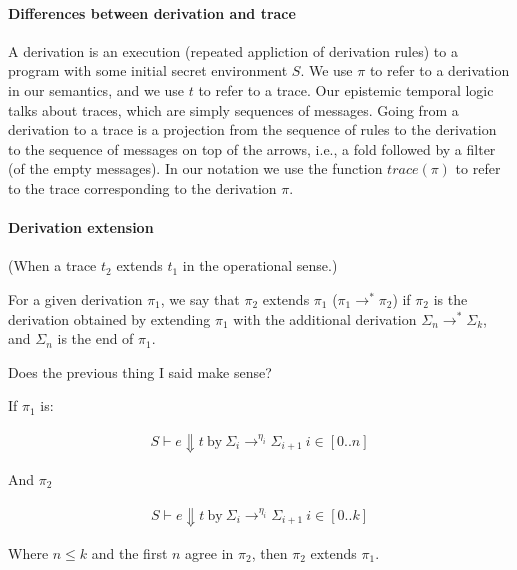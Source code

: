 \documentclass[conference]{IEEEtran}
\theoremstyle{definition}
\newcommand{\judge}{\vdash}
\newcommand{\tr}{t}
\begin{document}
\paragraph*{Differences between derivation and trace}

A derivation is an execution (repeated appliction of derivation rules)
to a program with some initial secret environment $S$.  We use $\pi$
to refer to a derivation in our semantics, and we use $\tr$ to refer
to a trace.  Our epistemic temporal logic talks about traces, which
are simply sequences of messages.  Going from a derivation to a trace
is a projection from the sequence of rules to the derivation to the
sequence of messages on top of the arrows, i.e., a fold followed by a
filter (of the empty messages).  In our notation we use the function
$trace(\pi)$ to refer to the trace corresponding to the derivation
$\pi$.

\paragraph*{Derivation extension} 

(When a trace $\tr_2$ extends $\tr_1$ in the operational sense.)

For a given derivation $\pi_1$, we say that $\pi_2$ extends $\pi_1$
($\pi_1 \rightarrow^\ast \pi_2$) if $\pi_2$ is the derivation obtained
by extending $\pi_1$ with the additional derivation $\Sigma_n
\rightarrow^\ast \Sigma_k$, and $\Sigma_n$ is the end of $\pi_1$.

Does the previous thing I said make sense?

If $\pi_1$ is: 

\begin{displaymath}
  \begin{array}{c}
    S \judge e \Downarrow \tr ~ \text{by} ~ \Sigma_i
    \rightarrow^{\eta_i} \Sigma_{i+1} ~ i \in [0..n]
  \end{array}
\end{displaymath}

And $\pi_2$ 

\begin{displaymath}
  \begin{array}{c}
    S \judge e \Downarrow \tr ~ \text{by} ~ \Sigma_i
    \rightarrow^{\eta_i} \Sigma_{i+1} ~ i \in [0..k]
  \end{array}
\end{displaymath}

Where $n \leq k$ and the first $n$ agree in $\pi_2$, then $\pi_2$
extends $\pi_1$.
\end{document}
